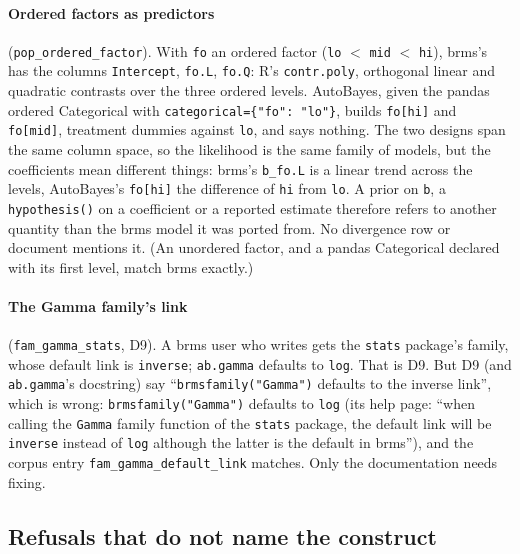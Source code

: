 \documentclass[11pt]{article}
\newcommand{\code}[1]{\texttt{#1}}
\newcommand{\f}[1]{\texttt{\detokenize{#1}}}
\begin{document}
\paragraph{Ordered factors as predictors} (\code{pop\_ordered\_factor}). With \code{fo} an ordered factor
(\code{lo} $<$ \code{mid} $<$ \code{hi}), brms's \f{y ~ fo} has the columns \code{Intercept}, \code{fo.L}, \code{fo.Q}:
R's \code{contr.poly}, orthogonal linear and quadratic contrasts over the three ordered levels. AutoBayes, given the pandas
ordered Categorical with \code{categorical=\{"fo": "lo"\}}, builds \code{fo[hi]} and \code{fo[mid]}, treatment dummies
against \code{lo}, and says nothing. The two designs span the same column space, so the likelihood is the same family of
models, but the coefficients mean different things: brms's \code{b\_fo.L} is a linear trend across the levels,
AutoBayes's \code{fo[hi]} the difference of \code{hi} from \code{lo}. A prior on \code{b}, a \code{hypothesis()} on a
coefficient or a reported estimate therefore refers to another quantity than the brms model it was ported from. No
divergence row or document mentions it. (An unordered factor, and a pandas Categorical declared with its first level, match
brms exactly.)

\paragraph{The Gamma family's link} (\code{fam\_gamma\_stats}, D9). A brms user who writes \f{family = Gamma()} gets the
\code{stats} package's family, whose default link is \code{inverse}; \code{ab.gamma} defaults to \code{log}. That is D9. But
D9 (and \code{ab.gamma}'s docstring) say ``\code{brmsfamily("Gamma")} defaults to the inverse link'', which is wrong:
\code{brmsfamily("Gamma")} defaults to \code{log} (its help page: ``when calling the \code{Gamma} family function of the
\code{stats} package, the default link will be \code{inverse} instead of \code{log} although the latter is the default in
brms''), and the corpus entry \code{fam\_gamma\_default\_link} matches. Only the documentation needs fixing.

\subsection{Refusals that do not name the construct}
\end{document}
